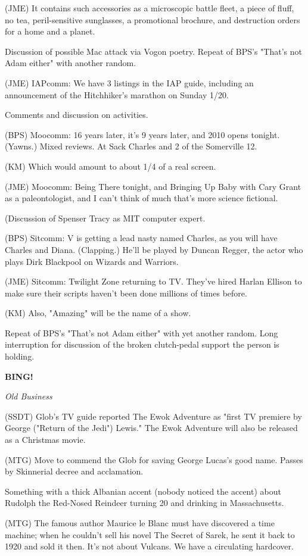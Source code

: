 \documentclass[12pt]{article}
\newcommand{\bing}{{\bf BING!} }
\newcommand{\goto}[1]{\bing \vskip 12pt \centerline{{\em{#1}}}}
\begin{document}
(JME) It contains such accessories as a microscopic battle fleet, a piece of fluff, no tea, peril-sensitive sunglasses, a promotional brochure, and destruction orders for a home and a planet.

Discussion of possible Mac attack via Vogon poetry. Repeat of BPS's "That's not Adam either" with another random.

(JME) IAPcomm: We have 3 listings in the IAP guide, including an announcement of the Hitchhiker's marathon on Sunday 1/20.

Comments and discussion on activities.

(BPS) Moocomm: 16 years later, it's 9 years later, and 2010 opens tonight. (Yawns.) Mixed reviews. At Sack Charles and 2 of the Somerville 12.

(KM) Which would amount to about 1/4 of a real screen.

(JME) Moocomm: Being There tonight, and Bringing Up Baby with Cary Grant as a paleontologist, and I can't think of much that's more science fictional.

(Discussion of Spenser Tracy as MIT computer expert.

(BPS) Sitcomm: V is getting a lead nasty named Charles, as you will have Charles and Diana. (Clapping.) He'll be played by Duncan Regger, the actor who plays Dirk Blackpool on Wizards and Warriors.

(JME) Sitcomm: Twilight Zone returning to TV. They've hired Harlan Ellison to make sure their scripts haven't been done millions of times before.

(KM) Also, "Amazing" will be the name of a show.

Repeat of BPS's "That's not Adam either" with yet another random. Long interruption for discussion of the broken clutch-pedal support the person is holding.

\goto{Old Business}

(SSDT) Glob's TV guide reported The Ewok Adventure as "first TV premiere by George ("Return of the Jedi") Lewis." The Ewok Adventure will also be released as a Christmas movie.

(MTG) Move to commend the Glob for saving George Lucas's good name. Passes by Skinnerial decree and acclamation.

Something with a thick Albanian accent (nobody noticed the accent) about Rudolph the Red-Nosed Reindeer turning 20 and drinking in Massachusetts.

(MTG) The famous author Maurice le Blanc must have discovered a time machine; when he couldn't sell his novel The Secret of Sarek, he sent it back to 1920 and sold it then. It's not about Vulcans. We have a circulating hardcover.
\end{document}
